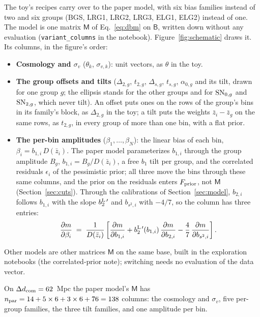 \documentclass[11pt]{article}
\newcommand{\mB}{\mathsf{B}}
\newcommand{\mM}{\mathsf{M}}
\newcommand{\npar}{n_{\rm par}}
\newcommand{\us}{\_\allowbreak}
\begin{document}
The toy's recipes carry over to the paper model, with six bias
families instead of two and six groups (BGS, LRG1, LRG2, LRG3, ELG1,
ELG2) instead of one.  The model is one matrix $\mM$ of
Eq.~\eqref{eq:dbm} on $\mB$, written down without any evaluation
(\texttt{variant\us columns} in the notebook).
Figure~\ref{fig:schematic} draws it.  Its columns, in the figure's
order:
\begin{itemize}
  \item \textbf{Cosmology and $\sigma_v$} ($\theta_k$,
    $\sigma_{v,k}$): unit vectors, as $\theta$ in the toy.
  \item \textbf{The group offsets and tilts} ($\Delta_{2,g}$,
    $t_{2,g}$, $\Delta_{s,g}$, $t_{s,g}$, $\alpha_{0,g}$ and its tilt,
    drawn for one group $g$; the ellipsis stands for the other groups
    and for ${\rm SN}_{0,g}$ and ${\rm SN}_{2,g}$, which never tilt).
    An offset puts ones on the rows of the group's bins in its
    family's block, as $\Delta_{2,g}$ in the toy; a tilt puts the
    weights $\bar{z}_i - \bar{z}_g$ on the same rows, as $t_{2,g}$, in
    every group of more than one bin, with a flat prior.
  \item \textbf{The per-bin amplitudes} ($\beta_1, \ldots, \beta_N$):
    the linear bias of each bin, $\beta_i = b_{1,i}\,D(\bar{z}_i)$.
    The paper model parameterizes $b_{1,i}$ through the group
    amplitude $B_g$, $b_{1,i} = B_g/D(\bar{z}_i)$, a free $b_1$ tilt
    per group, and the correlated residuals $\epsilon_i$ of the
    pessimistic prior; all three move the bins through these same
    columns, and the prior on the residuals enters $F_{\rm prior}$,
    not $\mM$ (Section~\ref{sec:cuts}).  Through the calibrations of
    Section~\ref{sec:model}, $b_{2,i}$ follows $b_{1,i}$ with the
    slope $b_2^{\rm L\,\prime}$ and $b_{s^2,i}$ with $-4/7$, so the
    column has three entries:
    \begin{equation}
      \frac{\partial m}{\partial \beta_i} \;=\;
      \frac{1}{D(\bar{z}_i)} \left[
        \frac{\partial m}{\partial b_{1,i}}
        + b_2^{\rm L\,\prime}(b_{1,i})\,\frac{\partial m}{\partial b_{2,i}}
        - \frac{4}{7}\,\frac{\partial m}{\partial b_{s^2,i}} \right] .
      \label{eq:chain}
    \end{equation}
\end{itemize}
Other models are other matrices $\mM$ on the same base, built in the
exploration notebooks (the correlated-prior note); switching needs no
evaluation of the data vector.

On $\Delta d_{\rm com} = 62$~Mpc the paper model's $\mM$ has
$\npar = 14 + 5 \times 6 + 3 \times 6 + 76 = 138$ columns: the
cosmology and $\sigma_v$, five per-group families, the three tilt
families, and one amplitude per bin.
\end{document}
